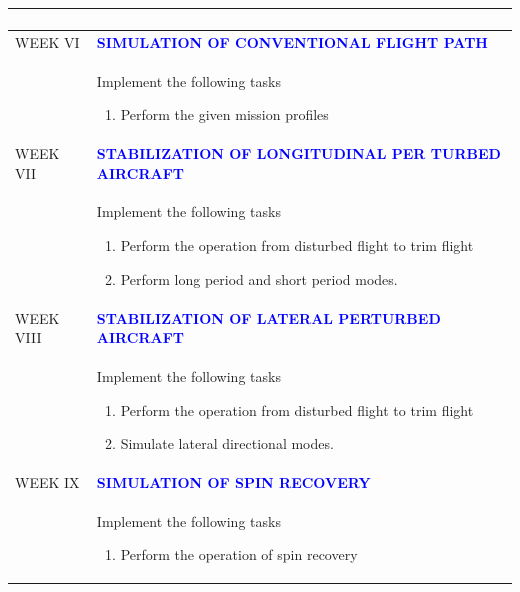 \documentclass[11pt]{exam}
\begin{document}
\begin{longtable}{|>{\centering\arraybackslash}p{2cm}  | >{\raggedright\arraybackslash}p{14cm}  | }
\begin{enumerate}
		\end{enumerate} \\
	\hline
	WEEK VI & \textcolor{blue}{\textbf{SIMULATION OF CONVENTIONAL FLIGHT PATH}}\\
	\hline
	& Implement the following tasks 
	\begin{enumerate}
	 \item Perform the given mission profiles
	\end{enumerate}
\\
	\hline
	WEEK VII & \textcolor{blue}{\textbf{STABILIZATION OF LONGITUDINAL PER TURBED AIRCRAFT}}\\
	\hline
	&Implement the following tasks
	\begin{enumerate}
\item Perform the operation from disturbed flight to trim flight
\item Perform long period and short period modes. 
		\end{enumerate}\\
	\hline
	WEEK VIII & \textcolor{blue}{\textbf{STABILIZATION OF LATERAL PERTURBED AIRCRAFT}}\\
	\hline
	&Implement the following tasks
	\begin{enumerate}
\item  Perform the operation from disturbed flight to trim flight
	\item Simulate lateral directional modes.
\end{enumerate} \\
	\hline
	WEEK IX & \textcolor{blue}{\textbf{SIMULATION OF SPIN RECOVERY}}\\
	\hline
	&Implement the following tasks 
	\begin{enumerate}
	\item  Perform the operation of spin recovery
\end{enumerate}	\\
	\hline
	

\end{longtable}
\end{document}
